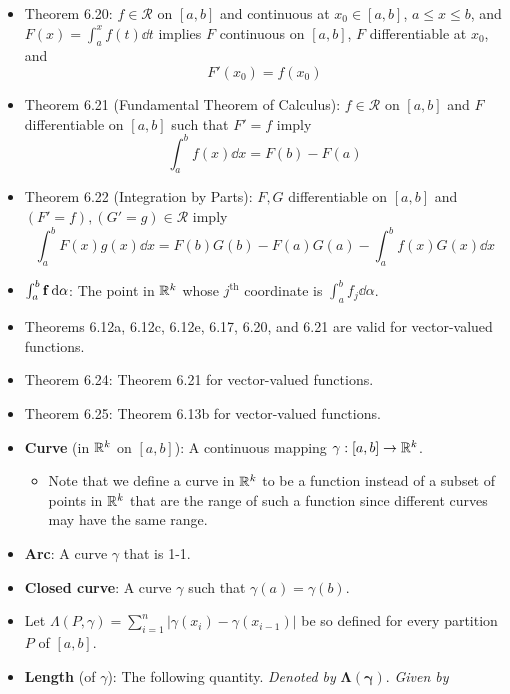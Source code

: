 \documentclass[../../notes.tex]{subfiles}
\begin{document}
\begin{itemize}
    \item Theorem 6.20: $f\in\mathscr{R}$ on $[a,b]$ and continuous at $x_0\in[a,b]$, $a\leq x\leq b$, and $F(x)=\int_a^xf(t)\dd{t}$ implies $F$ continuous on $[a,b]$, $F$ differentiable at $x_0$, and
    \begin{equation*}
        F'(x_0) = f(x_0)
    \end{equation*}
    \item Theorem 6.21 (Fundamental Theorem of Calculus): $f\in\mathscr{R}$ on $[a,b]$ and $F$ differentiable on $[a,b]$ such that $F'=f$ imply
    \begin{equation*}
        \int_a^bf(x)\dd{x} = F(b)-F(a)
    \end{equation*}
    \item Theorem 6.22 (Integration by Parts): $F,G$ differentiable on $[a,b]$ and $(F'=f),(G'=g)\in\mathscr{R}$ imply
    \begin{equation*}
        \int_a^bF(x)g(x)\dd{x} = F(b)G(b)-F(a)G(a)-\int_a^bf(x)G(x)\dd{x}
    \end{equation*}
    \item $\int_a^b\mathbf{f}\dd{\alpha}$: The point in $\mathbb{R}^k$ whose $j^\text{th}$ coordinate is $\int_a^bf_j\dd{\alpha}$.
    \item Theorems 6.12a, 6.12c, 6.12e, 6.17, 6.20, and 6.21 are valid for vector-valued functions.
    \item Theorem 6.24: Theorem 6.21 for vector-valued functions.
    \item Theorem 6.25: Theorem 6.13b for vector-valued functions.
    \item \textbf{Curve} (in $\mathbb{R}^k$ on $[a,b]$): A continuous mapping $\gamma:[a,b]\to\mathbb{R}^k$.
    \begin{itemize}
        \item Note that we define a curve in $\mathbb{R}^k$ to be a function instead of a subset of points in $\mathbb{R}^k$ that are the range of such a function since different curves may have the same range.
    \end{itemize}
    \item \textbf{Arc}: A curve $\gamma$ that is 1-1.
    \item \textbf{Closed curve}: A curve $\gamma$ such that $\gamma(a)=\gamma(b)$.
    \item Let $\Lambda(P,\gamma)=\sum_{i=1}^n|\gamma(x_i)-\gamma(x_{i-1})|$ be so defined for every partition $P$ of $[a,b]$.
    \item \textbf{Length} (of $\gamma$): The following quantity. \emph{Denoted by} $\bm{\Lambda(\gamma)}$. \emph{Given by}

\end{itemize}
\end{document}
